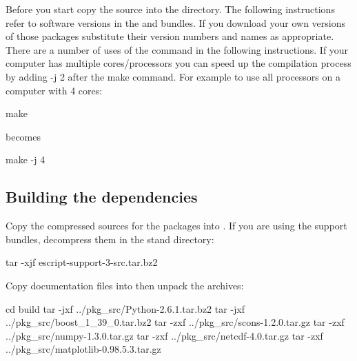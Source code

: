 Before you start copy the \esfinley source into the  directory.
The following instructions refer to software versions in the  and  bundles.
If you download your own versions of those packages substitute their version numbers and names as appropriate.
There are a number of uses of the  command in the following instructions.
If your computer has multiple cores/processors you can speed up the compilation process by adding -j 2 after the make command.
For example to use all processors on a computer with 4 cores:
\begin{shellCode}
 make
\end{shellCode}
becomes
\begin{shellCode}
 make -j 4
\end{shellCode}


\subsection{Building the dependencies}

Copy the compressed sources for the packages into .
If you are using the support bundles, decompress them in the stand directory:
\begin{shellCode}
tar -xjf escript-support-3-src.tar.bz2
\end{shellCode}

Copy documentation files into  then unpack the archives:

\begin{shellCode}
cd build
tar -jxf ../pkg_src/Python-2.6.1.tar.bz2
tar -jxf ../pkg_src/boost_1_39_0.tar.bz2
tar -zxf ../pkg_src/scons-1.2.0.tar.gz
tar -zxf ../pkg_src/numpy-1.3.0.tar.gz
tar -zxf ../pkg_src/netcdf-4.0.tar.gz
tar -zxf ../pkg_src/matplotlib-0.98.5.3.tar.gz
\end{shellCode}

